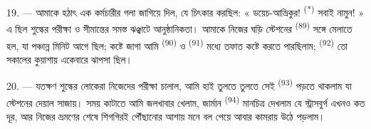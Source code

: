 \VUsaut{3.0mm}
\VUsaut{3.0mm}

19. --- আমাকে হঠাৎ এক কর্মচারীর গলা জাগিয়ে দিল, যে চিৎকার করছিল:
« ডয়েচ-আভ্রিকুর! \textsuperscript{(*)} সবাই নামুন! » এ ছিল শুল্কের পরীক্ষা ও
সীমান্তের সমস্ত ঝঞ্ঝাটে আনুষ্ঠানিকতা। আমাকে নিজের ঘড়ি স্টেশনের
 \textsuperscript{(89)} সঙ্গে মেলাতে হল, যা পঞ্চান্ন মিনিট আগে ছিল;
কষ্টে জাগা আমি  \textsuperscript{(90)} ও 
\textsuperscript{(91)} মধ্যে তফাত কষ্টে করতে পারছিলাম; 
\textsuperscript{(92)} তো সকালের কুয়াশায় একেবারে ঝাপসা ছিল।

20. --- যতক্ষণ শুল্কের লোকেরা নিজেদের পরীক্ষা চালাল, আমি হাই তুলতে তুলতে সেই
 \textsuperscript{(93)} পড়তে থাকলাম যা স্টেশনের দেয়াল
সাজায়। সময় কাটাতে আমি জলখাবার খেলাম, জার্মান 
\textsuperscript{(94)} মানচিত্র দেখলাম যে স্ট্রাসবুর্গ এখনও কত দূর, আর নিজের
ভ্রমণের শেষে শিগগিরই পৌঁছানোর আশায় মনে বল পেয়ে আবার কামরায় উঠে পড়লাম।
\VUsaut{6.0mm}
\VUfilet{22mm}
